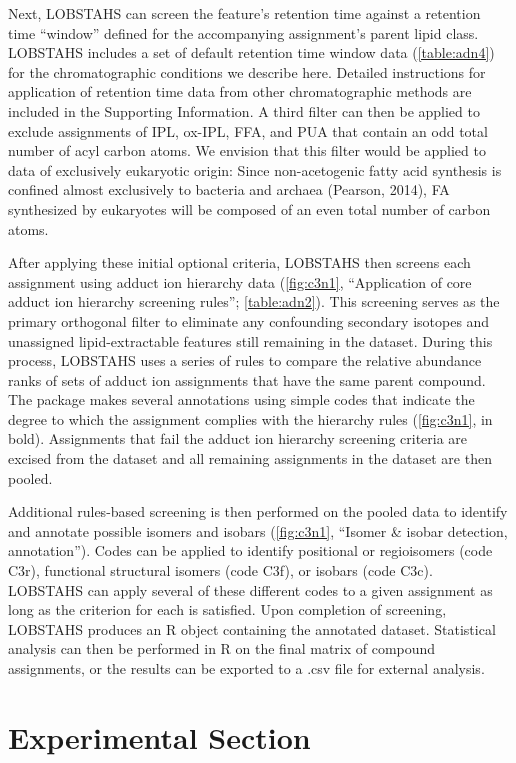 Next, LOBSTAHS can screen the feature's retention time against a retention time ``window'' defined for the accompanying assignment's parent lipid class. LOBSTAHS includes a set of default retention time window data (\autoref{table:adn4}) for the chromatographic conditions we describe here. Detailed instructions for application of retention time data from other chromatographic methods are included in the Supporting Information. A third filter can then be applied to exclude assignments of IPL, ox-IPL, FFA, and PUA that contain an odd total number of acyl carbon atoms. We envision that this filter would be applied to data of exclusively eukaryotic origin: Since non-acetogenic fatty acid synthesis is confined almost exclusively to bacteria and archaea (Pearson, 2014), FA synthesized by eukaryotes will be composed of an even total number of carbon atoms.

After applying these initial optional criteria, LOBSTAHS then screens each assignment using adduct ion hierarchy data (\autoref{fig:c3n1}, ``Application of core adduct ion hierarchy screening rules''; \autoref{table:adn2}). This screening serves as the primary orthogonal filter to eliminate any confounding secondary isotopes and unassigned lipid-extractable features still remaining in the dataset. During this process, LOBSTAHS uses a series of rules to compare the relative abundance ranks of sets of adduct ion assignments that have the same parent compound. The package makes several annotations using simple codes that indicate the degree to which the assignment complies with the hierarchy rules (\autoref{fig:c3n1}, in bold). Assignments that fail the adduct ion hierarchy screening criteria are excised from the dataset and all remaining assignments in the dataset are then pooled.

Additional rules-based screening is then performed on the pooled data to identify and annotate possible isomers and isobars (\autoref{fig:c3n1}, ``Isomer \& isobar detection, annotation''). Codes can be applied to identify positional or regioisomers (code C3r), functional structural isomers (code C3f), or isobars (code C3c). LOBSTAHS can apply several of these different codes to a given assignment as long as the criterion for each is satisfied. Upon completion of screening, LOBSTAHS produces an R object containing the annotated dataset. Statistical analysis can then be performed in R on the final matrix of compound assignments, or the results can be exported to a .csv file for external analysis.

\section{Experimental Section}

